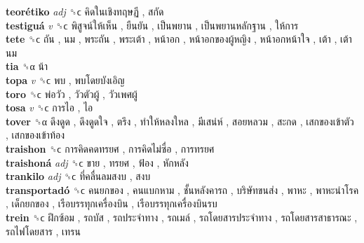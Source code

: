 \textbf{teorétiko} \emph{adj}  ␝ϲ   คิดในเชิงทฤษฏี ,  สกัด   \\
\textbf{testiguá} \emph{v}  ␝ϲ   พิสูจน์ให้เห็น ,  ยืนยัน ,  เป็นพยาน ,  เป็นพยานหลักฐาน ,  ให้การ   \\
\textbf{tete} ␝ϲ   ถัน ,  นม ,  พระถัน ,  พระเต้า ,  หน้าอก ,  หน้าอกของผู้หญิง ,  หน้าอกหน้าใจ ,  เต้า ,  เต้านม   \\
\textbf{tia} ␝α   น้า   \\
\textbf{topa} \emph{v}  ␝ϲ   พบ ,  พบโดยบังเอิญ   \\
\textbf{toro} ␝ϲ   พ่อวัว ,  วัวตัวผู้ ,  วัวเพศผู้   \\
\textbf{tosa} \emph{v}  ␝ϲ   การไอ ,  ไอ   \\
\textbf{tover} ␝α   ดึงดูด ,  ดึงดูดใจ ,  ตรึง ,  ทำให้หลงใหล ,  มีเสน่ห์ ,  สอยหลวม ,  สะกด ,  เสกของเข้าตัว ,  เสกของเข้าท้อง   \\
\textbf{traishon} ␝ϲ   การคิดคดทรยศ ,  การคิดไม่ซื่อ ,  การทรยศ   \\
\textbf{traishoná} \emph{adj}  ␝ϲ   ขาย ,  ทรยศ ,  ฟ้อง ,  หักหลัง   \\
\textbf{trankilo} \emph{adj}  ␝ϲ   ที่คลื่นลมสงบ ,  สงบ   \\
\textbf{transportadó} ␝ϲ   คนยกของ ,  คนแบกหาม ,  ชั้นหลังคารถ ,  บริษัทขนส่ง ,  พาหะ ,  พาหะนำโรค ,  เด็กยกของ ,  เรือบรรทุกเครื่องบิน ,  เรือบรรทุกเครื่องบินรบ   \\
\textbf{trein} ␝ϲ   ฝึกซ้อม ,  รถบัส ,  รถประจำทาง ,  รถเมล์ ,  รถโดยสารประจำทาง ,  รถโดยสารสาธารณะ ,  รถไฟโดยสาร ,  เทรน   \\
